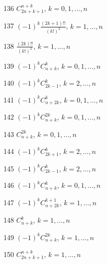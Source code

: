 \documentclass[11pt, russian]{article}
\begin{document}
136 
$C_{2n+k+1}^{n+k}$, $k=0,1,\ldots,n$\par\vspace{5mm}

137 
$(-1)^{k}\frac{(2k+1)!!}{(k!)^2}$, $k=1,\ldots,n$\par\vspace{5mm}

138 
$\frac{(2k)!!}{(k!)^2}$, $k=1,\ldots,n$\par\vspace{5mm}

139 
$(-1)^{k}C_{n+k}^{k}$, $k=0,1,\ldots,n$\par\vspace{5mm}

140 
$(-1)^{k}C_{2k-1}^{k}$, $k=2,\ldots,n$\par\vspace{5mm}

141 
$(-1)^{k}C_{n+2k}^{k}$, $k=0,1,\ldots,n$\par\vspace{5mm}

142 
$(-1)^{k}C_{n+k}^{2k}$, $k=0,1,\ldots,n$\par\vspace{5mm}

143 
$C_{n+k}^{2k}$, $k=0,1,\ldots,n$\par\vspace{5mm}

144 
$(-1)^{k}C_{2k+1}^{k}$, $k=2,\ldots,n$\par\vspace{5mm}

145 
$(-1)^{k}C_{2k-1}^{k}$, $k=2,\ldots,n$\par\vspace{5mm}

146 
$(-1)^{k}C_{n+k}^{k}$, $k=0,1,\ldots,n$\par\vspace{5mm}

147 
$(-1)^{k}C_{n+2k}^{k+1}$, $k=1,\ldots,n$\par\vspace{5mm}

148 
$C_{n+k}^{k}$, $k=1,\ldots,n$\par\vspace{5mm}

149 
$(-1)^{k}C_{n+k}^{2k}$, $k=1,\ldots,n$\par\vspace{5mm}

150 
$C_{2n+k+1}^{n+k}$, $k=1,\ldots,n$\par\vspace{5mm}
\end{document}
